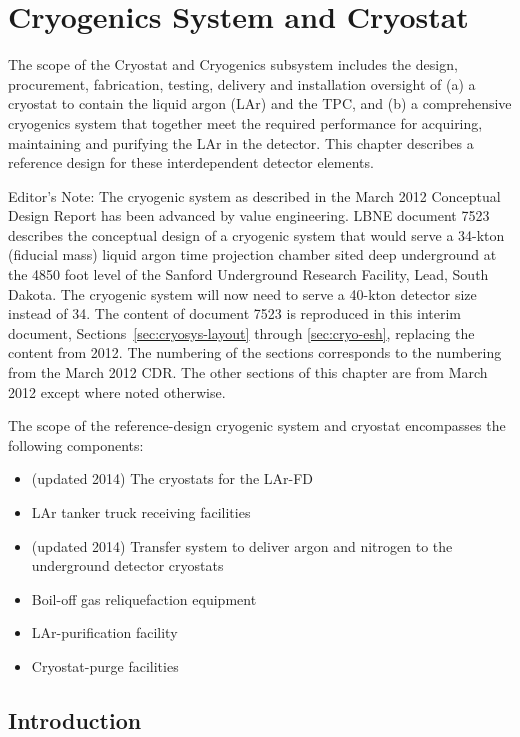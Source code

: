 \chapter{Cryogenics System and Cryostat}
\label{ch:cryosys}

The scope of the Cryostat and Cryogenics subsystem includes the design, procurement, fabrication, testing, delivery and installation oversight of (a) a cryostat to contain the
liquid argon (LAr) and the TPC, and (b) a comprehensive cryogenics system that together meet the required performance for acquiring, maintaining and purifying the
LAr in the detector.  This chapter describes a reference design for these interdependent detector elements.

\begin{editornote}
Editor's Note: The cryogenic system as described in the March
2012 Conceptual Design Report has been advanced by value engineering. 
LBNE document 7523 describes the conceptual design of a cryogenic system that would
serve a 34-kton (fiducial mass) liquid argon time projection chamber sited deep underground at
the 4850 foot level of the Sanford Underground Research Facility, Lead, South Dakota. The cryogenic system will now need to serve a 40-kton detector size instead of 34. The content of document 7523 is
reproduced in this interim document, Sections~\ref{sec:cryosys-layout} through \ref{sec:cryo-esh}, 
replacing the content from 2012. The numbering of the sections 
corresponds to the numbering from the March 2012 CDR. The other sections of this chapter are from March 2012 except where noted otherwise. 
\end{editornote}

The scope of the reference-design cryogenic system and cryostat encompasses the following components:

\begin{itemize}
\item (updated 2014) The cryostats for the LAr-FD 
\item LAr tanker truck receiving facilities
\item (updated 2014) Transfer system to deliver argon and nitrogen to the underground detector cryostats
\item Boil-off gas reliquefaction equipment
\item LAr-purification facility
\item Cryostat-purge facilities
\end{itemize}

\section{Introduction}


